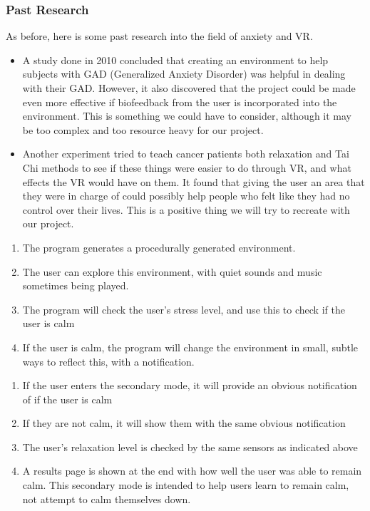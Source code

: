 \documentclass[a4paper,10pt]{article}
\begin{document}
\subsubsection{Past Research}
As before, here is some past research into the field of anxiety and VR.
\begin{itemize}
	\item A study done in 2010 concluded that creating an environment to help subjects with GAD (Generalized Anxiety Disorder) was helpful in dealing with their GAD.  However, it also discovered that the project could be made even more effective if biofeedback from the user is incorporated into the environment.  This is something we could have to consider, although it may be too complex and too resource heavy for our project. \cite{calmOne}
	\item Another experiment tried to teach cancer patients both relaxation and Tai Chi methods to see if these things were easier to do through VR, and what effects the VR would have on them.  It found that giving the user an area that they were in charge of could possibly help people who felt like they had no control over their lives. This is a positive thing we will try to recreate with our project.
\end{itemize}
\pagebreak
\begin{enumerate}
	\item The program generates a procedurally generated environment.
	\item The user can explore this environment, with quiet sounds and music sometimes being played.
	\item The program will check the user's stress level, and use this to check if the user is calm
	\item If the user is calm, the program will change the environment in small, subtle ways to reflect this, with a notification.
\end{enumerate}
\begin{enumerate}
	\item If the user enters the secondary mode, it will provide an obvious notification of if the user is calm
	\item If they are not calm, it will show them with the same obvious notification
	\item The user's relaxation level is checked by the same sensors as indicated above
	\item A results page is shown at the end with how well the user was able to remain calm.  This secondary mode is intended to help users learn to remain calm, not attempt to calm themselves down.
\end{enumerate}
\end{document}
